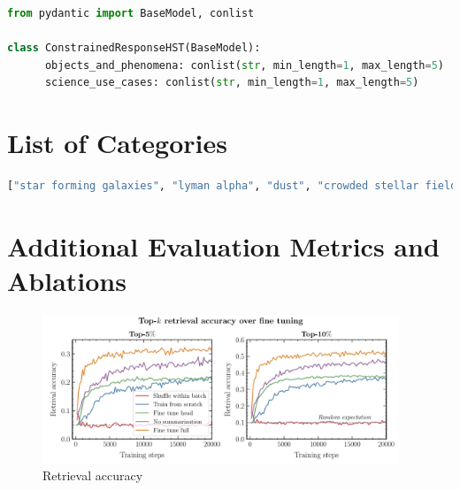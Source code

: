 \documentclass[10pt]{article} %
\begin{document}
\begin{lstlisting}[language=Python]
from pydantic import BaseModel, conlist

class ConstrainedResponseHST(BaseModel):
      objects_and_phenomena: conlist(str, min_length=1, max_length=5)
      science_use_cases: conlist(str, min_length=1, max_length=5)
\end{lstlisting}

\section{List of Categories}
\label{app:categories}

\begin{lstlisting}[language=Python]
  ["star forming galaxies", "lyman alpha", "dust", "crowded stellar field", "core-collapse supernova", "cosmology", "gravitational lensing", "supernovae", "diffuse galaxies", "globular clusters", "stellar populations", "interstellar medium", "black holes", "dark matter", "galaxy clusters", "galaxy evolution", "galaxy formation", "quasars", "circumstellar disks", "exoplanets", "Kuiper Belt objects", "solar system objects", "cosmic web structure", "distant galaxies", "galaxy mergers", "galaxy interactions", "star formation", "stellar winds", "brown dwarfs", "white dwarfs", "nebulae", "star clusters", "galaxy archeology", "galactic structure", "active galactic nuclei", "gamma-ray bursts", "stellar nurseries", "intergalactic medium", "dark energy", "dwarf galaxies", "barred spiral galaxies", "irregular galaxies", "starburst galaxies", "low surface brightness galaxies", "ultra diffuse galaxies", "circumgalactic medium", "intracluster medium", "cosmic dust", "interstellar chemistry", "star formation histories", "initial mass function", "stellar proper motions", "binary star systems", "open clusters", "pre-main sequence stars", "protostars", "protoplanetary disks", "jets and outflows", "interstellar shocks", "planetary nebulae", "supernova remnants", "red giants", "Cepheid variables", "RR Lyrae variables", "stellar abundances", "stellar dynamics", "compact stellar remnants", "Einstein rings", "trans-Neptunian objects", "cosmic microwave background", "reionization epoch", "first stars", "first galaxies", "high-redshift quasars", "primordial black holes", "resolved binaries", "binary stars"]
\end{lstlisting}

\section{Additional Evaluation Metrics and Ablations}
\label{app:ablations}

\begin{figure}[!h]
\includegraphics[width=0.95\textwidth]{plots/retrieval_acc.pdf}
\caption{Retrieval accuracy}
\label{fig:retrieval_acc_supp}
\end{figure}
  
\end{document}
